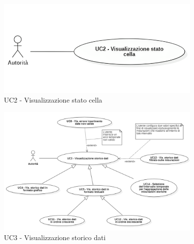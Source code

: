 

\begin{figure}[H]
    \centering
    \includegraphics[width=0.9\textwidth]{../Images/uc2.png}
    \caption{UC2 - Visualizzazione stato cella}
    \label{fig:UC2}
\end{figure}


\begin{figure}[H]
    \centering
    \includegraphics[width=0.9\textwidth]{../Images/uc3.png}
    \caption{UC3 - Visualizzazione storico dati }
    \label{fig:UC3}
\end{figure}


